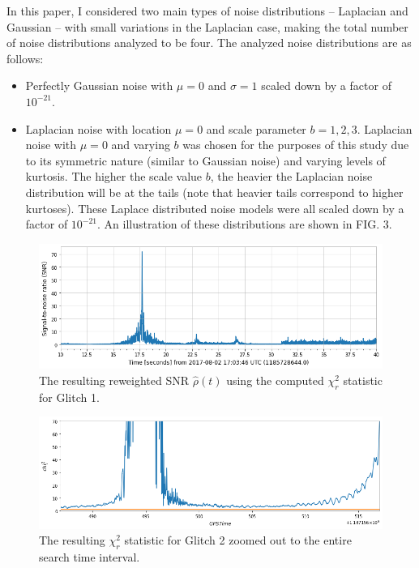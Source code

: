 \documentclass[preprint,
letterpaper,
 amsmath,amssymb,
 aps,
]{revtex4-2}
\begin{document}
In this paper, I considered two main types of noise distributions – Laplacian and Gaussian – with small variations in the Laplacian case, making the total number of noise distributions analyzed to be four. The analyzed noise distributions are as follows:
\begin{itemize}
    \item Perfectly Gaussian noise with $\mu = 0$  and $\sigma = 1$ scaled down by a factor of $10^{-21}$.
    \item Laplacian noise with location $\mu = 0$ and scale parameter $b = 1,2,3$. Laplacian noise with  $\mu = 0$ and varying $b$ was chosen for the purposes of this study due to its symmetric nature (similar to Gaussian noise) and varying levels of kurtosis. The higher the scale value $b$, the heavier the Laplacian noise distribution will be at the tails (note that heavier tails correspond to higher kurtoses). These Laplace distributed noise models were all scaled down by a factor of $10^{-21}$. An illustration of these distributions are shown in FIG. 3.
\end{itemize}

\begin{figure}[t]
\includegraphics[width = .9\textwidth]{reweighted glitch 1.png}
\caption{The resulting reweighted SNR $\hat{\rho}(t)$ using the computed $\chi^2_r$ statistic for Glitch 1.}
\centering
\end{figure} 

\begin{figure}
\includegraphics[width = .9\textwidth]{chi2 glitch 2 zoomed.png}
\caption{The resulting $\chi^2_r$ statistic for Glitch 2 zoomed out to the entire search time interval.}
\centering
\end{figure}
\end{document}
